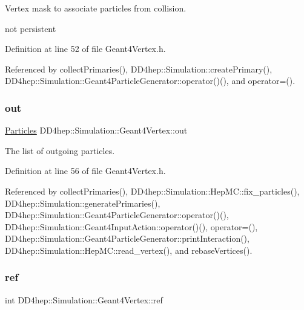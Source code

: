 Vertex mask to associate particles from collision. 

not persistent 

Definition at line 52 of file Geant4\+Vertex.\+h.



Referenced by collect\+Primaries(), D\+D4hep\+::\+Simulation\+::create\+Primary(), D\+D4hep\+::\+Simulation\+::\+Geant4\+Particle\+Generator\+::operator()(), and operator=().

\hypertarget{class_d_d4hep_1_1_simulation_1_1_geant4_vertex_a238ee91ad7a5d6230d58335af4af6d70}{}\label{class_d_d4hep_1_1_simulation_1_1_geant4_vertex_a238ee91ad7a5d6230d58335af4af6d70} 
\subsubsection{\texorpdfstring{out}{out}}
{\footnotesize\ttfamily \hyperlink{class_d_d4hep_1_1_simulation_1_1_geant4_vertex_a7a0331b96dfa8ff9b4a802caa8dd031c}{Particles} D\+D4hep\+::\+Simulation\+::\+Geant4\+Vertex\+::out}



The list of outgoing particles. 



Definition at line 56 of file Geant4\+Vertex.\+h.



Referenced by collect\+Primaries(), D\+D4hep\+::\+Simulation\+::\+Hep\+M\+C\+::fix\+\_\+particles(), D\+D4hep\+::\+Simulation\+::generate\+Primaries(), D\+D4hep\+::\+Simulation\+::\+Geant4\+Particle\+Generator\+::operator()(), D\+D4hep\+::\+Simulation\+::\+Geant4\+Input\+Action\+::operator()(), operator=(), D\+D4hep\+::\+Simulation\+::\+Geant4\+Particle\+Generator\+::print\+Interaction(), D\+D4hep\+::\+Simulation\+::\+Hep\+M\+C\+::read\+\_\+vertex(), and rebase\+Vertices().

\hypertarget{class_d_d4hep_1_1_simulation_1_1_geant4_vertex_a27572aae6fd5018503860b323bc9d34e}{}\label{class_d_d4hep_1_1_simulation_1_1_geant4_vertex_a27572aae6fd5018503860b323bc9d34e} 
\subsubsection{\texorpdfstring{ref}{ref}}
{\footnotesize\ttfamily int D\+D4hep\+::\+Simulation\+::\+Geant4\+Vertex\+::ref}



